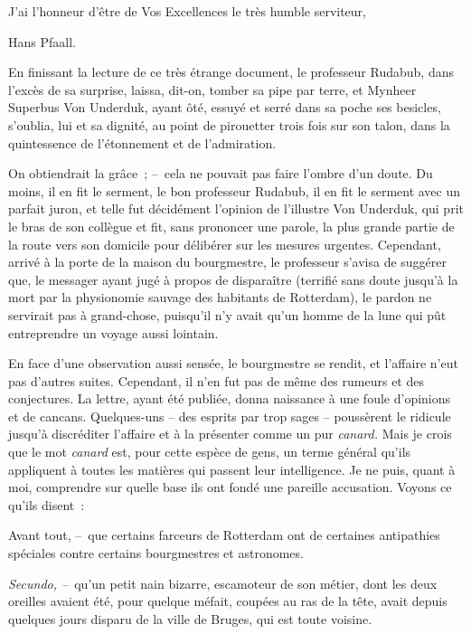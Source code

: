 \documentclass[french,twoside]{book} %
\begin{document}
J’ai l’honneur d’être de Vos Excellences le très humble serviteur,\par
{\raggedleft \noindent Hans Pfaall.\par}
\bigbreak
\noindent En finissant la lecture de ce très étrange document, le professeur Rudabub, dans l’excès de sa surprise, laissa, dit-on, tomber sa pipe par terre, et Mynheer Superbus Von Underduk, ayant ôté, essuyé et serré dans sa poche ses besicles, s’oublia, lui et sa dignité, au point de pirouetter trois fois sur son talon, dans la quintessence de l’étonnement et de l’admiration.\par
On obtiendrait la grâce ; – cela ne pouvait pas faire l’ombre d’un doute. Du moins, il en fit le serment, le bon professeur Rudabub, il en fit le serment avec un parfait juron, et telle fut décidément l’opinion de l’illustre Von Underduk, qui prit le bras de son collègue et fit, sans prononcer une parole, la plus grande partie de la route vers son domicile pour délibérer sur les mesures urgentes. Cependant, arrivé à la porte de la maison du bourgmestre, le professeur s’avisa de suggérer que, le messager ayant jugé à propos de disparaître (terrifié sans doute jusqu’à la mort par la physionomie sauvage des habitants de Rotterdam), le pardon ne servirait pas à grand-chose, puisqu’il n’y avait qu’un homme de la lune qui pût entreprendre un voyage aussi lointain.\par
En face d’une observation aussi sensée, le bourgmestre se rendit, et l’affaire n’eut pas d’autres suites. Cependant, il n’en fut pas de même des rumeurs et des conjectures. La lettre, ayant été publiée, donna naissance à une foule d’opinions et de cancans. Quelques-uns – des esprits par trop sages – poussèrent le ridicule jusqu’à discréditer l’affaire et à la présenter comme un pur \emph{canard.} Mais je crois que le mot \emph{canard} est, pour cette espèce de gens, un terme général qu’ils appliquent à toutes les matières qui passent leur intelligence. Je ne puis, quant à moi, comprendre sur quelle base ils ont fondé une pareille accusation. Voyons ce qu’ils disent :\par
Avant tout, – que certains farceurs de Rotterdam ont de certaines antipathies spéciales contre certains bourgmestres et astronomes.\par
\emph{Secundo, –} qu’un petit nain bizarre, escamoteur de son métier, dont les deux oreilles avaient été, pour quelque méfait, coupées au ras de la tête, avait depuis quelques jours disparu de la ville de Bruges, qui est toute voisine.\par
\end{document}
